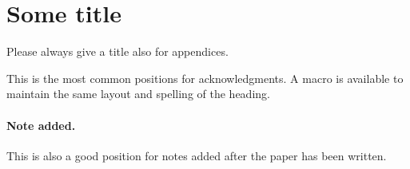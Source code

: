 \documentclass[a4paper,11pt]{article}
\begin{document}
\appendix
\section{Some title}
Please always give a title also for appendices.





\acknowledgments

This is the most common positions for acknowledgments. A macro is
available to maintain the same layout and spelling of the heading.

\paragraph{Note added.} This is also a good position for notes added
after the paper has been written.











\end{document}
